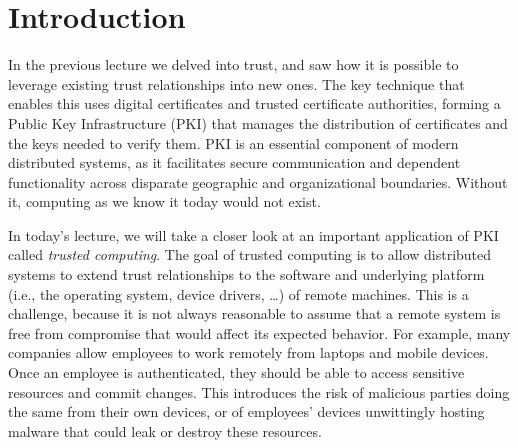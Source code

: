 \documentclass[11pt,twoside]{scrartcl}
\begin{document}

\lstset{escapechar=@,style=customc}

\maketitle
\thispagestyle{empty}


\section{Introduction}

In the previous lecture we delved into trust, and saw how it is possible to leverage existing trust relationships into new ones. The key technique that enables this uses digital certificates and trusted certificate authorities, forming a Public Key Infrastructure (PKI) that manages the distribution of certificates and the keys needed to verify them. PKI is an essential component of modern distributed systems, as it facilitates secure communication and dependent functionality across disparate geographic and organizational boundaries. Without it, computing as we know it today would not exist.

In today's lecture, we will take a closer look at an important application of PKI called \emph{trusted computing}. The goal of trusted computing is to allow distributed systems to extend trust relationships to the software and underlying platform (i.e., the operating system, device drivers, \ldots) of remote machines. This is a challenge, because it is not always reasonable to assume that a remote system is free from compromise that would affect its expected behavior. For example, many companies allow employees to work remotely from laptops and mobile devices. Once an employee is authenticated, they should be able to access sensitive resources and commit changes. This introduces the risk of malicious parties doing the same from their own devices, or of employees' devices unwittingly hosting malware that could leak or destroy these resources. 
\end{document}

